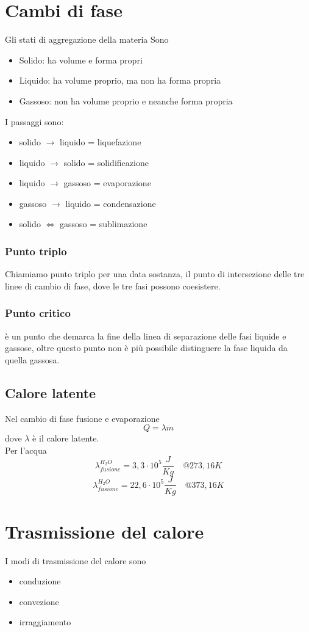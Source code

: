 \documentclass[a4paper]{report}
\begin{document}
  \section{Cambi di fase}
  Gli stati di aggregazione della materia Sono
  \begin{itemize}
    \item Solido: ha volume e forma propri
    \item Liquido: ha volume proprio, ma non ha forma propria
    \item Gassoso: non ha volume proprio e neanche forma propria
  \end{itemize}
  I passaggi sono:
  \begin{itemize}
    \item solido $\rightarrow$ liquido = liquefazione
    \item liquido $\rightarrow$ solido = solidificazione
    \item liquido $\rightarrow$ gassoso = evaporazione
    \item gassoso $\rightarrow$ liquido = condensazione
    \item solido $\iff$ gassoso = sublimazione
  \end{itemize}
  \subsubsection{Punto triplo}
  Chiamiamo punto triplo per una data sostanza, il punto di intersezione delle tre linee di cambio di fase, dove le tre fasi possono coesistere.
  \subsubsection{Punto critico}
  è un punto che demarca la fine della linea di separazione delle fasi liquide e gassose, oltre questo punto non è più possibile distinguere la fase liquida da quella gassosa.
  \subsection{Calore latente}
  Nel cambio di fase fusione e evaporazione
  $$ Q = \lambda m$$
  dove $\lambda$ è il calore latente.\\
  Per l'acqua
  $$ \lambda_{fusione}^{H_2O} = 3,3 \cdot 10^5 \frac{J}{Kg} \quad @ 273,16 K $$
  $$ \lambda_{fusione}^{H_2O} = 22,6 \cdot 10^5 \frac{J}{Kg} \quad @ 373,16K $$

  \section{Trasmissione del calore}
  I modi di trasmissione del calore sono
  \begin{itemize}
    \item conduzione
    \item convezione
    \item irraggiamento
  \end{itemize}
\end{document}
